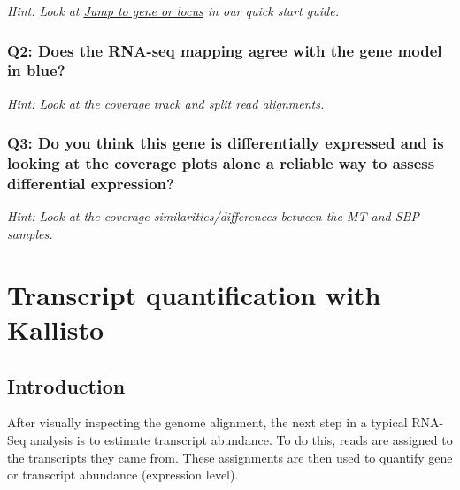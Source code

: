 \documentclass[11pt]{article}
\begin{document}
\textit{Hint: Look at
\href{https://github.com/sanger-pathogens/pathogen-informatics-training/blob/master/Notebooks/IGV/index.ipynb}{Jump
to gene or locus} in our quick start guide.}

\hypertarget{q2-does-the-rna-seq-mapping-agree-with-the-gene-model-in-blue}{%
\subsubsection{Q2: Does the RNA-seq mapping agree with the gene model in
blue?}\label{q2-does-the-rna-seq-mapping-agree-with-the-gene-model-in-blue}}

\textit{Hint: Look at the coverage track and split read alignments.}

\hypertarget{q3-do-you-think-this-gene-is-differentially-expressed-and-is-looking-at-the-coverage-plots-alone-a-reliable-way-to-assess-differential-expression}{%
\subsubsection{Q3: Do you think this gene is differentially expressed
and is looking at the coverage plots alone a reliable way to assess
differential
expression?}\label{q3-do-you-think-this-gene-is-differentially-expressed-and-is-looking-at-the-coverage-plots-alone-a-reliable-way-to-assess-differential-expression}}

\textit{Hint: Look at the coverage similarities/differences between the MT
and SBP samples.}





\newpage





    \hypertarget{transcript-quantification-with-kallisto}{%
\section{Transcript quantification with
Kallisto}\label{transcript-quantification-with-kallisto}}

    \hypertarget{introduction}{%
\subsection{Introduction}\label{introduction}}

After visually inspecting the genome alignment, the next step in a
typical RNA-Seq analysis is to estimate transcript abundance. To do
this, reads are assigned to the transcripts they came from. These
assignments are then used to quantify gene or transcript abundance
(expression level).
\end{document}

